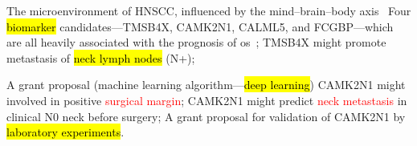 \documentclass[
paper=landscape,
paper=160mm:90mm, %
fontsize=11pt, %
pagesize, %
parskip=half-, %
]{scrartcl} %
\theoremstyle{mythmstyle} %
\begin{document}
\begin{outline}

\1 The microenvironment of HNSCC, influenced by the mind--brain--body axis~\autocite{Hsiao2012}
    \2 Four \hl{biomarker} candidates---TMSB4X, CAMK2N1, CALML5, and FCGBP---which are all heavily associated with the prognosis of \acrlong{os}~\autocite{Chi2017, Chi2021};
    \2 TMSB4X might promote metastasis of \hl{neck lymph nodes} (N+);

    

\1 A grant proposal (machine learning algorithm---\hl{deep learning})
    \2 CAMK2N1 might involved in positive \textcolor{red}{surgical margin};
    \2 CAMK2N1 might predict \textcolor{red}{neck metastasis} in clinical N0 neck before surgery;
\1 A grant proposal for validation of CAMK2N1 by \hl{laboratory experiments}.

\end{outline}

%
\clearpage

\thispagestyle{headings}
\end{document}
